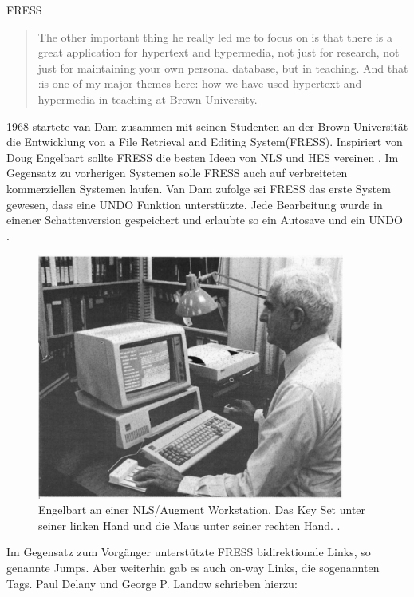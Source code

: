 \begin{section}{FRESS}
\label{sec:fress}

\begin{quote}
\glqq The other important thing he really led me to focus on is that there is a great application for hypertext and hypermedia, not just for research, not just for maintaining your own personal database, but in teaching. And that :is one of my major themes here: how we have used hypertext and hypermedia in teaching at Brown University.\grqq{ }\cite[S.888]{Dam1988}
\end{quote}
	
1968 startete van Dam zusammen mit seinen Studenten an der Brown Universität die Entwicklung von \glqq a File Retrieval and Editing System\grqq{ }(FRESS). Inspiriert von Doug Engelbart sollte FRESS die besten Ideen von NLS und HES vereinen \cite[S.887 und 890]{Dam1988}. Im Gegensatz zu vorherigen Systemen solle FRESS auch auf verbreiteten kommerziellen Systemen laufen. Van Dam zufolge sei FRESS das erste System gewesen, dass eine UNDO Funktion unterstützte. Jede Bearbeitung wurde in einener Schattenversion gespeichert und erlaubte so ein Autosave und ein UNDO \cite[S.891]{Dam1988}.

\begin{figure}[H]
	\centering
	\includegraphics[width=0.9\textwidth]{image/augment}
	\caption{Engelbart an einer NLS/Augment Workstation. Das Key Set unter seiner linken Hand und die Maus unter seiner rechten Hand. \cite{Conklin1987}.}
	\label{fig:augment}
\end{figure}

Im Gegensatz zum Vorgänger unterstützte FRESS bidirektionale Links, so genannte \glqq Jumps\grqq{ }. Aber weiterhin gab es auch on-way Links, die sogenannten \glqq Tags\grqq{ }. Paul Delany und George P. Landow schrieben hierzu: 


\end{section}
